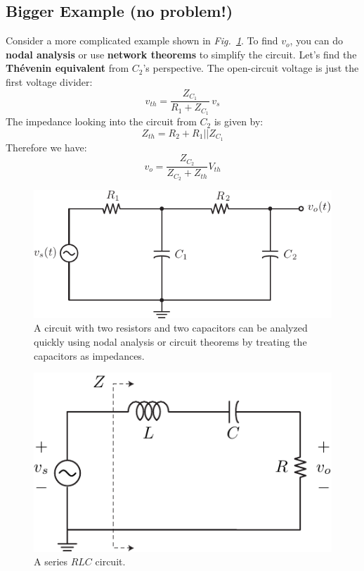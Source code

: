 \subsection{Bigger Example (no problem!)}
Consider a more complicated example shown in \emph{Fig.~\ref{fig:bigexample}}.  To find $v_o$, you can do \textbf{nodal analysis} or use \textbf{network theorems} to simplify the circuit.  Let's find the \textbf{Thévenin equivalent} from $C_2$'s perspective.  The open-circuit voltage is just the first voltage divider:
    \begin{equation}
        v_{th} = \frac{Z_{C_1}}{R_1 + Z_{C_1}}\,v_s 
    \end{equation}
The impedance looking into the circuit from $C_2$ is given by:
    \begin{equation}
        Z_{th} = R_2 + R_1 \big|\big| Z_{C_1}
    \end{equation}
Therefore we have:
    \begin{equation}
        v_o = \frac{Z_{C_2}}{Z_{C_2} + Z_{th}} V_{th} 
    \end{equation}
\begin{figure}[H]
\centering
\includegraphics[angle=-0.0,scale=1]{mod1_3_7_rc_lpf2}
\caption{A circuit with two resistors and two capacitors can be analyzed quickly using nodal analysis or circuit theorems by treating the capacitors as impedances.}
\label{fig:bigexample}
\end{figure}
\newpage
\begin{figure}[t]
\centering
\includegraphics[scale=1]{rlc}
\caption{A series $RLC$ circuit.}
\label{fig:rlc}
\end{figure}
